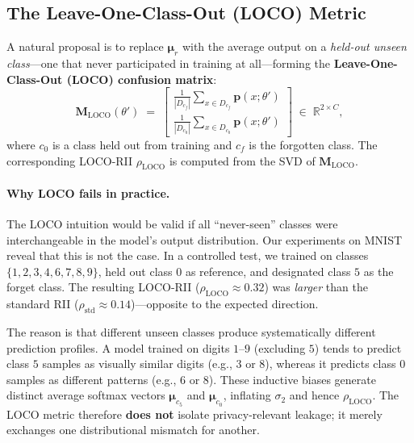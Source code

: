 \documentclass[journal]{IEEEtran}
\theoremstyle{definition}
\begin{document}
\subsection{The Leave-One-Class-Out (LOCO) Metric}
\label{sec:loco}

A natural proposal is to replace $\boldsymbol{\mu}_r$ with the average output on a \emph{held-out unseen class}---one that never participated in training at all---forming the \textbf{Leave-One-Class-Out (LOCO) confusion matrix}:
\begin{equation}
\boxed{
\mathbf{M}_{\mathrm{LOCO}}(\theta') \;=\;
\begin{bmatrix}
\displaystyle\frac{1}{|D_{c_f}|}\sum_{x \in D_{c_f}} \mathbf{p}(x;\theta') \\[2.2ex]
\displaystyle\frac{1}{|D_{c_0}|}\sum_{x \in D_{c_0}} \mathbf{p}(x;\theta')
\end{bmatrix}
\;\in\; \mathbb{R}^{2\times C},
}
\end{equation}
where $c_0$ is a class held out from training and $c_f$ is the forgotten class. The corresponding LOCO-RII $\rho_{\mathrm{LOCO}}$ is computed from the SVD of $\mathbf{M}_{\mathrm{LOCO}}$.

\paragraph{Why LOCO fails in practice.}
The LOCO intuition would be valid if all ``never-seen'' classes were interchangeable in the model's output distribution. Our experiments on MNIST reveal that this is not the case. In a controlled test, we trained on classes $\{1,2,3,4,6,7,8,9\}$, held out class $0$ as reference, and designated class $5$ as the forget class. The resulting LOCO-RII ($\rho_{\mathrm{LOCO}} \approx 0.32$) was \emph{larger} than the standard RII ($\rho_{\mathrm{std}} \approx 0.14$)---opposite to the expected direction.

The reason is that different unseen classes produce systematically different prediction profiles. A model trained on digits $1$--$9$ (excluding $5$) tends to predict class $5$ samples as visually similar digits (e.g., $3$ or $8$), whereas it predicts class $0$ samples as different patterns (e.g., $6$ or $8$). These inductive biases generate distinct average softmax vectors $\boldsymbol{\mu}_{c_5}$ and $\boldsymbol{\mu}_{c_0}$, inflating $\sigma_2$ and hence $\rho_{\mathrm{LOCO}}$. The LOCO metric therefore \textbf{does not} isolate privacy-relevant leakage; it merely exchanges one distributional mismatch for another.
\end{document}
